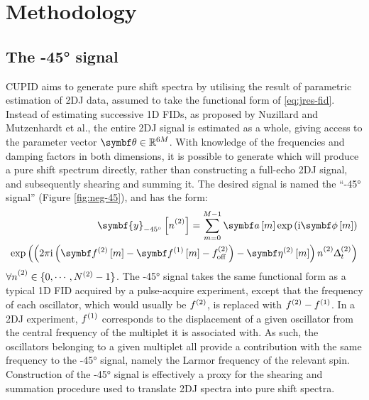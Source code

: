 \section{Methodology}
\subsection{The \ang{-45} signal}
\ac{CUPID} aims to generate pure shift spectra by utilising the result of
parametric estimation of \ac{2DJ} data, assumed to take the functional form of
\eqref{eq:jres-fid}.
Instead of estimating successive \ac{1D} \acp{FID}, as proposed by
Nuzillard and Mutzenhardt et al., the entire \ac{2DJ} signal is estimated as a
whole, giving access to the parameter vector $\bth \in \mathbb{R}^{6M}$. With
knowledge of the frequencies and damping factors in both dimensions, it is
possible to generate  which will produce a pure shift spectrum
directly, rather than constructing a full-echo \ac{2DJ} signal, and
subsequently shearing and summing it. The desired signal is named
the ``\ang{-45} signal'' (Figure
\ref{fig:neg-45}), and has the form:
\begin{equation}
    \begin{split}
        \symbf{y}_{\ang{-45}}\left[ \ntwo \right] =
            \sum_{m=0}^{M-1} \bdam \exp \left(\iu \bdphim \right)\\
            \exp\left(
                \left(
                    2 \pi \iu \left(\bdftwom - \bdfonem - \fofftwo\right)
                    - \bdetatwom
                \right) \ntwo \Dttwo
            \right)
    \end{split}
    \label{eq:neg-45}
\end{equation}
$\forall \ntwo \in \lbrace 0, \cdots, \Ntwo - 1 \rbrace$. The \ang{-45} signal
takes the same functional form as a typical \ac{1D}
\ac{FID} acquired by a pulse-acquire experiment, except that the frequency of
each oscillator, which would usually be $f^{(2)}$, is replaced with $f^{(2)} -
f^{(1)}$. In a \ac{2DJ} experiment, $f^{(1)}$ corresponds to the displacement of a
given oscillator from the central frequency of the multiplet it is associated
with. As such, the oscillators belonging to a given multiplet all provide
a contribution with the same frequency to the \ang{-45} signal, namely the
Larmor frequency of the relevant spin. Construction of the \ang{-45} signal is
effectively a proxy for the shearing and summation procedure used to translate
\ac{2DJ} spectra into pure shift spectra.
